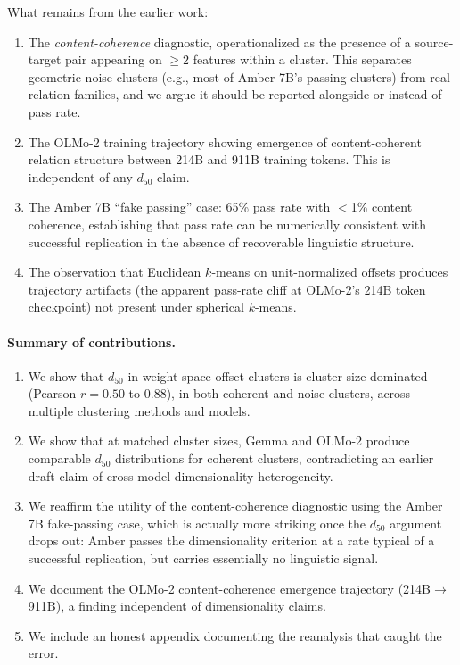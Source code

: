 \documentclass[11pt,letterpaper]{article}
\begin{document}
What remains from the earlier work:
\begin{enumerate}[leftmargin=*,itemsep=0pt]
\item The \emph{content-coherence} diagnostic, operationalized as the presence of a source-target pair appearing on $\geq 2$ features within a cluster. This separates geometric-noise clusters (e.g., most of Amber 7B's passing clusters) from real relation families, and we argue it should be reported alongside or instead of pass rate.
\item The OLMo-2 training trajectory showing emergence of content-coherent relation structure between 214B and 911B training tokens. This is independent of any $d_{50}$ claim.
\item The Amber 7B ``fake passing'' case: 65\% pass rate with $<$1\% content coherence, establishing that pass rate can be numerically consistent with successful replication in the absence of recoverable linguistic structure.
\item The observation that Euclidean $k$-means on unit-normalized offsets produces trajectory artifacts (the apparent pass-rate cliff at OLMo-2's 214B token checkpoint) not present under spherical $k$-means.
\end{enumerate}

\paragraph{Summary of contributions.}
\begin{enumerate}[leftmargin=*,itemsep=0pt]
\item We show that $d_{50}$ in weight-space offset clusters is cluster-size-dominated (Pearson $r = 0.50$ to $0.88$), in both coherent and noise clusters, across multiple clustering methods and models.
\item We show that at matched cluster sizes, Gemma and OLMo-2 produce comparable $d_{50}$ distributions for coherent clusters, contradicting an earlier draft claim of cross-model dimensionality heterogeneity.
\item We reaffirm the utility of the content-coherence diagnostic using the Amber 7B fake-passing case, which is actually more striking once the $d_{50}$ argument drops out: Amber passes the dimensionality criterion at a rate typical of a successful replication, but carries essentially no linguistic signal.
\item We document the OLMo-2 content-coherence emergence trajectory (214B$\to$911B), a finding independent of dimensionality claims.
\item We include an honest appendix documenting the reanalysis that caught the error.
\end{enumerate}
\end{document}
